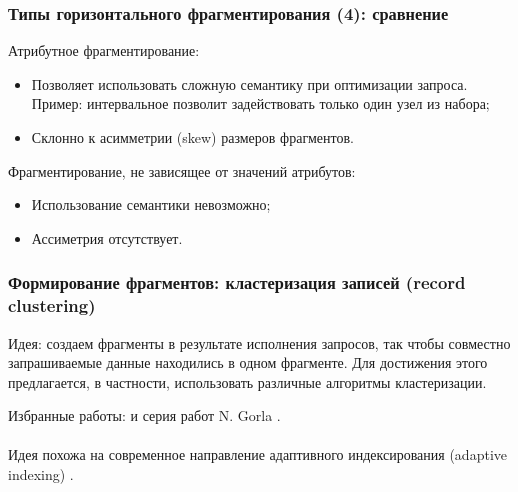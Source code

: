 \documentclass[unicode]{beamer}
\begin{document}
\begin{frame}
\frametitle{Типы горизонтального фрагментирования (4): сравнение}

Атрибутное фрагментирование:

\begin{itemize}
  \setlength\itemsep{1em}	
  \item Позволяет использовать сложную семантику при оптимизации запроса. Пример: интервальное позволит задействовать только один узел из набора;
  \item Склонно к асимметрии (skew) размеров фрагментов.
\end{itemize}

Фрагментирование, не зависящее от значений атрибутов:

\begin{itemize}
  \setlength\itemsep{1em}	
  \item Использование семантики невозможно;
  \item Ассиметрия отсутствует.
\end{itemize}

\end{frame}

\begin{frame}
\frametitle{Формирование фрагментов: кластеризация записей (record clustering)}

\begin{block}{}
Идея: создаем фрагменты в результате исполнения запросов, так чтобы совместно запрашиваемые данные находились в одном фрагменте. Для достижения этого предлагается, в частности, использовать различные алгоритмы кластеризации.
\end{block}

Избранные работы: \cite{p20, p19} и серия работ N. Gorla \cite{p18}.
\\~\\
Идея похожа на современное направление адаптивного индексирования (adaptive indexing) \cite{p21}.

\end{frame}
\end{document}
